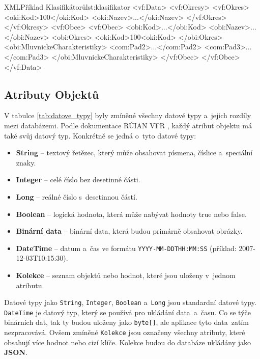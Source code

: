 \begin{code}{XML}{Příklad Klasifikátorů}{lst:klasifikator}
<vf:Data>
    <vf:Okresy>
        <vf:Okres>
            <oki:Kod>100</oki:Kod>
            <oki:Nazev>...</oki:Nazev>
        </vf:Okres>
    </vf:Okresy>
    <vf:Obce>
        <vf:Obec>
            <obi:Kod>...</obi:Kod>
            <obi:Nazev>...</obi:Nazev>
            <obi:Okres>
                <oki:Kod>100<oki:Kod>
            </obi:Okres>
            <obi:MluvnickeCharakteristiky>
                <com:Pad2>...</com:Pad2>
                <com:Pad3>...</com:Pad3>
            </obi:MluvnickeCharakteristiky>
        </vf:Obec>
    </vf:Obce>
</vf:Data>
\end{code}

\subsection{Atributy Objektů}
V tabulce \ref{tab:datove_typy} byly zmíněné všechny datové typy a~jejich rozdíly mezi databázemi.
Podle dokumentace RÚIAN VFR \cite{ruian_vfr}, každý atribut objektu má také svůj datový typ.
Konkrétně se jedná o~tyto datové typy:
\begin{itemize}
    \item \textbf{String} -- textový řetězec, který může obsahovat písmena, číslice a~speciální znaky.
    \item \textbf{Integer} -- celé číslo bez desetinné části.
    \item \textbf{Long} -- reálné číslo s~desetinnou částí.
    \item \textbf{Boolean} -- logická hodnota, která může nabývat hodnoty true nebo false.
    \item \textbf{Binární data} -- binární data, která budou primárně obsahovat obrázky.
    \item \textbf{DateTime} -- datum a~čas ve formátu \texttt{YYYY-MM-DDTHH:MM:SS} (příklad: 2007-12-03T10:15:30).
    \item \textbf{Kolekce} -- seznam objektů nebo hodnot, které jsou uloženy v~jednom atributu.
\end{itemize}

Datové typy jako \texttt{String}, \texttt{Integer}, \texttt{Boolean} a~\texttt{Long} jsou standardní datové typy.
\texttt{DateTime} je datový typ, který se používá pro ukládání data~a~času.
Co se týče binárních dat, tak ty budou uloženy jako \texttt{byte[]},
ale aplikace tyto data~zatím nezpracovává.
Ovšem zmíněné \texttt{Kolekce} jsou označeny všechny atributy, které obsahují více hodnot nebo cizí klíče.
Kolekce budou do databáze ukládány jako \textbf{JSON}.

